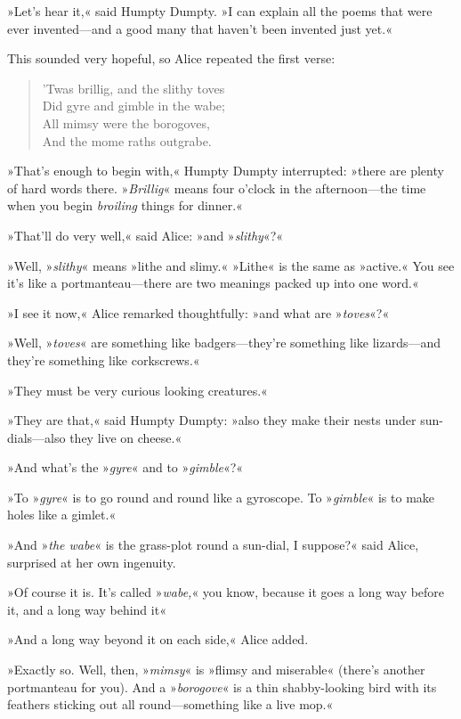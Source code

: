 »Let's hear it,« said Humpty Dumpty. »I can explain all the poems that were ever invented—and a good many that haven't been invented just yet.«

This sounded very hopeful, so Alice repeated the first verse:

\begin{verse}
'Twas brillig, and the slithy toves\\
\vin Did gyre and gimble in the wabe;\\
All mimsy were the borogoves,\\
\vin And the mome raths outgrabe.
\end{verse}

»That's enough to begin with,« Humpty Dumpty interrupted: »there are plenty of hard words there. »\textit{Brillig}« means four o'clock in the afternoon—the time when you begin \textit{broiling} things for dinner.«

»That'll do very well,« said Alice: »and »\textit{slithy}«?«

»Well, »\textit{slithy}« means »lithe and slimy.« »Lithe« is the same as »active.« You see it's like a portmanteau—there are two meanings packed up into one word.«

»I see it now,« Alice remarked thoughtfully: »and what are »\textit{toves}«?«

»Well, »\textit{toves}« are something like badgers—they're something like lizards—and they're something like corkscrews.«

»They must be very curious looking creatures.«

»They are that,« said Humpty Dumpty: »also they make their nests under sun-dials—also they live on cheese.«

»And what's the »\textit{gyre}« and to »\textit{gimble}«?«

»To »\textit{gyre}« is to go round and round like a gyroscope. To »\textit{gimble}« is to make holes like a gimlet.«

»And »\textit{the wabe}« is the grass-plot round a sun-dial, I suppose?« said Alice, surprised at her own ingenuity.

»Of course it is. It's called »\textit{wabe,}« you know, because it goes a long way before it, and a long way behind it\longdash«

»And a long way beyond it on each side,« Alice added.

»Exactly so. Well, then, »\textit{mimsy}« is »flimsy and miserable« (there's another portmanteau for you). And a »\textit{borogove}« is a thin shabby-looking bird with its feathers sticking out all round—something like a live mop.«

